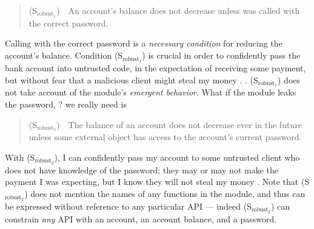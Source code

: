 \begin{quote}
(S$_{\text{robust}_1}$)\ \ An account's balance does not decrease unless  was called 
with the correct password.
\end{quote}

Calling   with the  correct password is 
a \emph{necessary condition} for reducing the account's  balance.
Condition   
(S$_{\text{robust}_1}$) is crucial in order to confidently pass the bank account into untrusted code, 
in the expectation of receiving some payment, but without fear
that a malicious client might steal my money \cite{ELang,miller-esop2013}.
.
 (S$_{\text{robust}_1}$) does not take  account of the module's \emph{emergent behavior}.
 What if the module leaks the password, ?
  we really need is
 \begin{quote}
(S$_{\text{robust}_2}$)\  \ The balance of an account does not decrease ever in the future unless some external 
object has access to the account's current password.
\end{quote}
With (S$_{\text{robust}_2}$), I can confidently pass my account to some untrusted client who
  does not have
 knowledge of the password; they may or may not make the payment I was expecting, but I
 know they will not steal my money \cite{ooToSecurity,miller-esop2013}.
 Note that (S$_{\text{robust}_2}$)  does not mention
 the names of any functions in the module, and 
 thus can be expressed without reference to any particular API ---
 indeed (S$_{\text{robust}_2}$) can constrain \emph{any} API with an account, an account
 balance, and a password.


 
 

